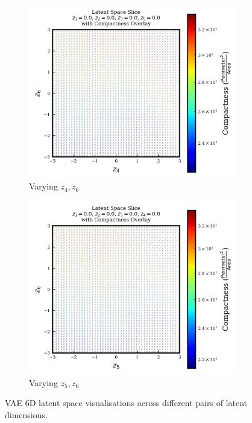 \documentclass{article}
\begin{document}
\begin{figure}[H]
    \begin{subfigure}{0.3\textwidth}
        \includegraphics[width=\linewidth]{figures/VAEmodels/model5/varying_z4_z6_fixed_z1=0.0_z2=0.0_z3=0.0_z5=0.0.png}
        \caption{Varying $z_4, z_6$}
    \end{subfigure}
    \hfill
    \begin{subfigure}{0.3\textwidth}
        \includegraphics[width=\linewidth]{figures/VAEmodels/model5/varying_z5_z6_fixed_z1=0.0_z2=0.0_z3=0.0_z4=0.0.png}
        \caption{Varying $z_5, z_6$}
    \end{subfigure}

    \caption{VAE 6D latent space visualisations across different pairs of latent dimensions.}
    \label{fig:vae_model5}
\end{figure}









\newpage{}


\end{document}
